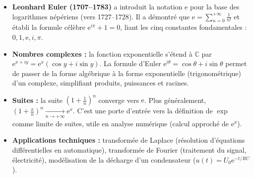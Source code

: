 \documentclass[11pt]{article}
\begin{document}
\begin{savaistu}
\begin{itemize}
\item \textbf{Leonhard Euler (1707--1783)} a introduit la notation $\mathrm{e}$ pour la base des logarithmes népériens (vers 1727--1728). Il a démontré que $\mathrm{e} = \sum_{n=0}^{+\infty} \frac{1}{n!}$ et établi la formule célèbre $\mathrm{e}^{i\pi} + 1 = 0$, liant les cinq constantes fondamentales : $0, 1, \mathrm{e}, i, \pi$.
\item \textbf{Nombres complexes :} la fonction exponentielle s'étend à $\mathbb{C}$ par $\mathrm{e}^{x+iy} = \mathrm{e}^x(\cos y + i\sin y)$. La formule d'Euler $\mathrm{e}^{i\theta} = \cos\theta + i\sin\theta$ permet de passer de la forme algébrique à la forme exponentielle (trigonométrique) d'un complexe, simplifiant produits, puissances et racines.
\item \textbf{Suites :} la suite $\left(1+\frac{1}{n}\right)^n$ converge vers $\mathrm{e}$. Plus généralement, $\left(1+\frac{x}{n}\right)^n \xrightarrow[n\to+\infty]{} \mathrm{e}^x$. C'est une porte d'entrée vers la définition de $\exp$ comme limite de suites, utile en analyse numérique (calcul approché de $\mathrm{e}^x$).
\item \textbf{Applications techniques :} transformée de Laplace (résolution d'équations différentielles en automatique), transformée de Fourier (traitement du signal, électricité), modélisation de la décharge d'un condensateur ($u(t) = U_0 \mathrm{e}^{-t/RC}$).
\end{itemize}
\end{savaistu}
\end{document}

